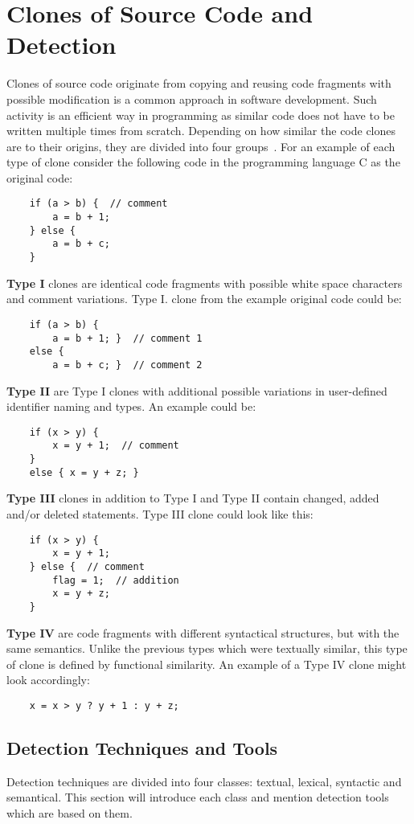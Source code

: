   \section{Clones of Source Code and Detection}
    Clones of source code originate from copying and reusing code fragments with possible modification
    is a common approach in software development. Such activity is an efficient way in programming as similar
    code does not have to be written multiple times from scratch. Depending on how similar the code clones are to
    their origins, they are divided into four groups~\cite{CodeClonesSurvey}. For an example of each type of clone
    consider the following code in the programming language C as the original code:
    \begin{verbatim}
    if (a > b) {  // comment
        a = b + 1;
    } else {
        a = b + c;
    }
    \end{verbatim}
    \textbf{Type I} clones are identical code fragments with possible white space characters and comment
    variations.
    Type I. clone from the example original code could be:
    \begin{verbatim}
    if (a > b) {
        a = b + 1; }  // comment 1
    else {
        a = b + c; }  // comment 2
    \end{verbatim}
    \textbf{Type II} are Type I clones with additional possible variations in user-defined identifier naming
    and types. An example could be:
    \begin{verbatim}
    if (x > y) {
        x = y + 1;  // comment
    }
    else { x = y + z; }
    \end{verbatim}
    \textbf{Type III} clones in addition to Type I and Type II contain changed, added and/or deleted statements.
    Type III clone could look like this:
    \begin{verbatim}
    if (x > y) {
        x = y + 1;
    } else {  // comment
        flag = 1;  // addition
        x = y + z;
    }
    \end{verbatim}
    \textbf{Type IV} are code fragments with different syntactical structures, but with the same semantics. Unlike
    the previous types which were textually similar, this type of clone is defined by functional similarity.
    An example of a Type IV clone might look accordingly:
    \begin{verbatim}
    x = x > y ? y + 1 : y + z;
    \end{verbatim}

    \subsection*{Detection Techniques and Tools}
    Detection techniques are divided into four classes: textual, lexical, syntactic and semantical.
    This section will introduce each class and mention detection tools which are based on them.

